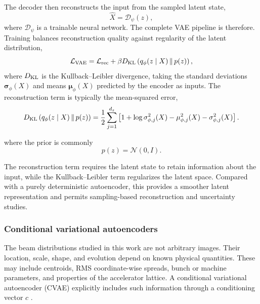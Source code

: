 The decoder then reconstructs the input from the sampled latent state,
\begin{equation}
    \widehat{X}
    =
    \mathcal{D}_{\psi}(z),
\end{equation}
where $\mathcal{D}_{\psi}$ is a trainable neural network. The complete VAE pipeline is therefore. Training balances reconstruction quality against regularity of the latent distribution, 
\begin{equation}
    \mathcal{L}_{\mathrm{VAE}}
    =
    \mathcal{L}_{\mathrm{rec}}
    +
    \beta
    D_{\mathrm{KL}}
    \left(
    q_{\phi}(z\mid X)
    \,\Vert\,
    p(z)
    \right),
    \label{eq:vae_loss_intro}
\end{equation}
where $D_{\mathrm{KL}}$ is the Kullback--Leibler divergence, taking the standard deviations $\bm{\sigma}_{\phi}(X)$ and means $\bm{\mu}_{\phi}(X)$ predicted by the encoder as inputs. The reconstruction term is typically the mean-squared error,
\begin{equation}
    D_{\mathrm{KL}}
    \left(
    q_{\phi}(z\mid X)
    \,\Vert\,
    p(z)
    \right)
    =
    \frac{1}{2}
    \sum_{j=1}^{d_z}
    \left[
        1
        +
        \log
        \sigma_{\phi,j}^{2}(X)
        -
        \mu_{\phi,j}^{2}(X)
        -
        \sigma_{\phi,j}^{2}(X)
    \right].
    \label{eq:KL_term}
\end{equation}


where the prior is commonly
\begin{equation}
    p(z)
    =
    \mathcal{N}(0,I).
\end{equation}

The reconstruction term requires the latent state to retain information about the input, while the Kullback--Leibler term regularizes the latent space. Compared with a purely deterministic autoencoder, this provides a smoother latent representation and permits sampling-based reconstruction and uncertainty studies.

\subsubsection{Conditional variational autoencoders}
\label{subsubsec:cvae_foundations}

The beam distributions studied in this work are not arbitrary images. Their location, scale, shape, and evolution depend on known physical quantities. These may include centroids, RMS coordinate-wise spreads, bunch or machine parameters, and properties of the accelerator lattice. A conditional variational autoencoder (CVAE) explicitly includes such information through a conditioning vector $c$ \cite{sohn_cvae_2015}.

